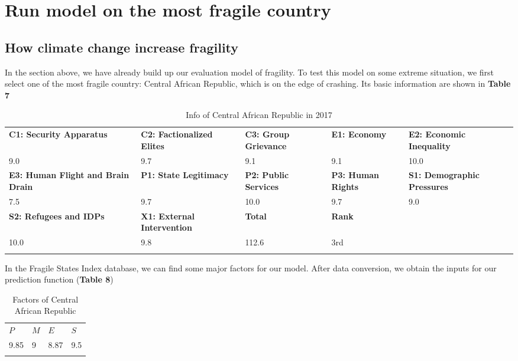 \documentclass{mcmthesis}
\newlength\savedwidth
\newcommand\whline{\noalign{\global\savedwidth\arrayrulewidth
		\global\arrayrulewidth 1.2pt}%
	\hline
	\noalign{\global\arrayrulewidth\savedwidth}}
\newlength\savewidth
\newcommand\shline{\noalign{\global\savewidth\arrayrulewidth
		\global\arrayrulewidth 1.2pt}%
	\hline
	\noalign{\global\arrayrulewidth\savewidth}}
\begin{document}
	\section{Run model on the most fragile country}
	\subsection{How climate change increase fragility}
	In the section above, we have already build up our evaluation model of fragility. To test this model on some extreme situation, we first select one of the most fragile country: Central African Republic, which is on the edge of crashing. Its basic information are shown in \textbf{Table 7}

	\begin{table}[htbp]
		\renewcommand\arraystretch{1.5}
		\footnotesize
		\centering
		\begin{tabular}{m{2.5cm}<{\centering}|m{2.5cm}<{\centering}|m{2.5cm}<{\centering}|m{2.5cm}<{\centering}|m{2.5cm}<{\centering}}
			\whline
			\textbf{C1: Security Apparatus}&\textbf{C2: Factionalized Elites}&\textbf{C3: Group Grievance}&\textbf{E1: Economy}&\textbf{E2: Economic Inequality} \\
			\whline
			9.0 & 9.7 & 9.1 & 9.1 & 10.0\\
			\whline
			\textbf{E3: Human Flight and Brain Drain}&\textbf{P1: State Legitimacy}&\textbf{P2: Public Services}&\textbf{P3: Human Rights}&\textbf{S1: Demographic Pressures} \\
			\whline
			7.5 & 9.7 & 10.0 & 9.7 & 9.0\\
			\whline
			\textbf{S2: Refugees and IDPs}&\textbf{X1: External Intervention}&\textbf{Total}& \textbf{Rank} & \\
			\whline
			10.0 & 9.8 & 112.6 & 3rd &\\
			\shline
		\end{tabular}
		\caption{Info of Central African Republic in 2017}\label{tab:Info of Central African Republic in 2017}
	\end{table}
	
	
	In the Fragile States Index database, we can find some major factors for our model. After data conversion, we obtain the inputs for our prediction function (\textbf{Table 8})
	
	\begin{table}[htbp]
		\renewcommand\arraystretch{1.5}
		\footnotesize
		\centering
		\begin{tabular}{m{2.5cm}<{\centering}|m{2.5cm}<{\centering}|m{2.5cm}<{\centering}|m{2.5cm}<{\centering}}
			\whline
			\textbf{$P$}&\textbf{$M$}&\textbf{$E$}&\textbf{$S$}\\
			\whline
			9.85 & 9 & 8.87 & 9.5 \\
			\shline
		\end{tabular}
		\caption{Factors of Central African Republic}\label{tab:Factors of Central African Republic}
	\end{table}
	
\end{document}
